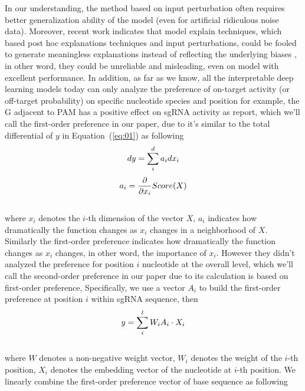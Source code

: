 \documentclass{bioinfo}
\begin{document}
 In our understanding, the method based on input perturbation often requires better generalization ability of the model (even for artificial ridiculous noise data). 
 Moreover, recent work indicates that model explain techniques, which based post hoc explanations techniques and input perturbations, could be fooled to generate meaningless explanations instead of reflecting the underlying biases \citep{slack2019fooling}, 
 in other word, they could be unreliable and misleading, even on model with excellent performance. 
 In addition, as far as we know, all the interpretable deep learning models today can only analyze the preference of on-target activity (or off-target probability) on specific nucleotide species and position 
 for example, the G adjacent to PAM has a positive effect on sgRNA activity as \citeauthor{wang2019optimized} report, 
 which we'll call the first-order preference in our paper, due to it's similar to the total differential of $y$ in Equation~(\ref{eq:01}) as following
\begin{equation}
dy = \sum^{d}_ia_idx_i\label{eq:02}\vspace*{-10pt}
\end{equation}
\begin{equation}
a_i=\frac{\partial}{\partial x_i} Score(X)\label{eq:03}\vspace*{-10pt}
\end{equation}\\
 where $x_i$ denotes the $i$-th dimension of the vector $X$, 
 $a_i$ indicates how dramatically the function changes as $x_i$ changes in a neighborhood of $X$. 
 Similarly the first-order preference indicates how dramatically the function changes as $x_i$ changes, in other word, the importance of $x_i$.
 However they didn't analyzed the preference for position $i$ nucleotide at the overall level, 
 which we'll call the second-order preference in our paper due to its calculation is based on first-order preference, 
 Specifically, we use a vector $A_i$ to build the first-order preference at position $i$ within sgRNA sequence, then
\begin{equation}
y=\sum_i^lW_iA_i\cdot X_i\label{eq:04}\vspace*{-10pt}
\end{equation}\\
 where $W$ denotes a non-negative weight vector, $W_i$ denotes the weight of the $i$-th position, $X_i$ denotes the embedding vector of the nucleotide at $i$-th position.
 We linearly combine the first-order preference vector of base sequence as following
\end{document}
